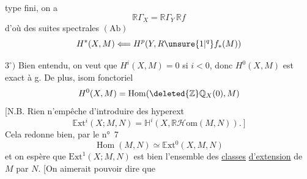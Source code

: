 type fini, on a
\[
\mathbb R\Gamma_X=\mathbb R\Gamma_Y\,\mathbb R f
\]
d'où des suites spectrales  $(\mathrm{Ab})$
\[
H^*(X,M)\Longleftarrow H^p(Y,R\unsure{1|{}^q}f_*(M))
\]

$3^\circ)$ Bien entendu, on veut que $H^i(X,M)=0$ si $i<0$, donc $H^0(X,M)$ est exact à g. De plus, isom fonctoriel
\[
H^0(X,M)=\operatorname{Hom}(\deleted{\mathbb Z}\mathbb Q_X(0),M)
\]
[N.B. Rien n'empêche d'introduire des hyperext
\[
\mathbb E\mathrm{xt}^i(X;M,N)=\mathbb H^i(X,\mathbb R\mathcal H\mathrm{om}(M,N)).\ ]
\]
Cela redonne bien, par le n°~7
\[
\operatorname{Hom}(M,N)\simeq\mathbb E\mathrm{xt}^0(X,M,N)
\]
et on espère que $\mathrm{Ext}^{1}(X;M,N)$ est bien l'ensemble des \uline{classes} \uline{d'extension} de $M$ par $N$. [On aimerait pouvoir dire que

